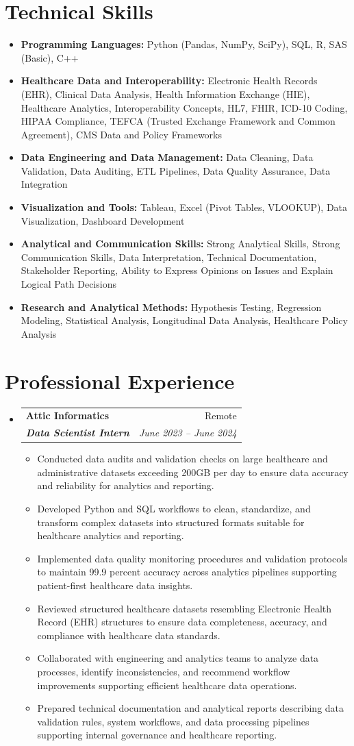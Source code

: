 \documentclass[letterpaper,11pt]{article}
\makeatletter
\newcommand{\resumeItem}[1]{
  \item\small{
    {#1 \vspace{-2pt}}
  }
}
\newcommand{\resumeSubheading}[4]{
  \vspace{-2pt}\item
    \begin{tabular*}{0.97\textwidth}[t]{l@{\extracolsep{\fill}}r}
      \textbf{#1} & #2 \\
      \textit{\small#3} & \textit{\small #4} \\
    \end{tabular*}\vspace{-7pt}
}
\newcommand{\resumeSubHeadingListStart}{\begin{itemize}[leftmargin=0.15in, label={}]}
\newcommand{\resumeSubHeadingListEnd}{\end{itemize}}
\newcommand{\resumeItemListStart}{\begin{itemize}}
\newcommand{\resumeItemListEnd}{\end{itemize}\vspace{-5pt}}
\makeatother
\begin{document}
\section{Technical Skills}
\vspace{1pt}
\resumeSubHeadingListStart
\resumeItem{\textbf{Programming Languages:} Python (Pandas, NumPy, SciPy), SQL, R, SAS (Basic), C++}
\resumeItem{\textbf{Healthcare Data and Interoperability:} Electronic Health Records (EHR), Clinical Data Analysis, Health Information Exchange (HIE), Healthcare Analytics, Interoperability Concepts, HL7, FHIR, ICD-10 Coding, HIPAA Compliance, TEFCA (Trusted Exchange Framework and Common Agreement), CMS Data and Policy Frameworks}
\resumeItem{\textbf{Data Engineering and Data Management:} Data Cleaning, Data Validation, Data Auditing, ETL Pipelines, Data Quality Assurance, Data Integration}
\resumeItem{\textbf{Visualization and Tools:} Tableau, Excel (Pivot Tables, VLOOKUP), Data Visualization, Dashboard Development}
\resumeItem{\textbf{Analytical and Communication Skills:} Strong Analytical Skills, Strong Communication Skills, Data Interpretation, Technical Documentation, Stakeholder Reporting, Ability to Express Opinions on Issues and Explain Logical Path Decisions}
\resumeItem{\textbf{Research and Analytical Methods:} Hypothesis Testing, Regression Modeling, Statistical Analysis, Longitudinal Data Analysis, Healthcare Policy Analysis}
\resumeSubHeadingListEnd

\section{Professional Experience}
\vspace{1pt}
\resumeSubHeadingListStart
\resumeSubheading
{Attic Informatics}{Remote}
{\textbf{Data Scientist Intern}}{June 2023 -- June 2024}
\vspace{0pt}
\resumeItemListStart
\resumeItem{Conducted data audits and validation checks on large healthcare and administrative datasets exceeding 200GB per day to ensure data accuracy and reliability for analytics and reporting.}
\resumeItem{Developed Python and SQL workflows to clean, standardize, and transform complex datasets into structured formats suitable for healthcare analytics and reporting.}
\resumeItem{Implemented data quality monitoring procedures and validation protocols to maintain 99.9 percent accuracy across analytics pipelines supporting patient-first healthcare data insights.}
\resumeItem{Reviewed structured healthcare datasets resembling Electronic Health Record (EHR) structures to ensure data completeness, accuracy, and compliance with healthcare data standards.}
\resumeItem{Collaborated with engineering and analytics teams to analyze data processes, identify inconsistencies, and recommend workflow improvements supporting efficient healthcare data operations.}
\resumeItem{Prepared technical documentation and analytical reports describing data validation rules, system workflows, and data processing pipelines supporting internal governance and healthcare reporting.}
\resumeItemListEnd
\resumeSubHeadingListEnd
\end{document}
